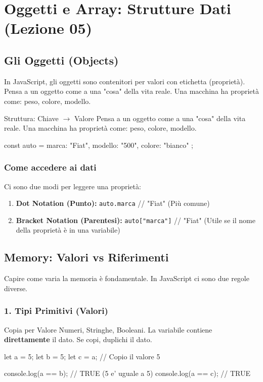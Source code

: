 \section{Oggetti e Array: Strutture Dati (Lezione 05)}

\subsection{Gli Oggetti (Objects)}
In JavaScript, gli oggetti sono contenitori per valori con etichetta (proprietà).
Pensa a un oggetto come a una "cosa" della vita reale. Una macchina ha proprietà come: peso, colore, modello.

\begin{concept}{Struttura: Chiave $\to$ Valore}
Pensa a un oggetto come a una "cosa" della vita reale. Una macchina ha proprietà come: peso, colore, modello.
\end{concept}
\begin{jsbox}
const auto = {
    marca: "Fiat",
    modello: "500",
    colore: "bianco"
};
\end{jsbox}

\subsubsection{Come accedere ai dati}
Ci sono due modi per leggere una proprietà:
\begin{enumerate}
    \item \textbf{Dot Notation (Punto):} \texttt{auto.marca} // "Fiat" (Più comune)
    \item \textbf{Bracket Notation (Parentesi):} \texttt{auto["marca"]} // "Fiat" (Utile se il nome della proprietà è in una variabile)
\end{enumerate}

\subsection{Memory: Valori vs Riferimenti}
Capire come varia la memoria è fondamentale. In JavaScript ci sono due regole diverse.

\subsubsection{1. Tipi Primitivi (Valori)}
\begin{concept}{Copia per Valore}
Numeri, Stringhe, Booleani. La variabile contiene \textbf{direttamente} il dato. Se copi, duplichi il dato.
\end{concept}
\begin{jsbox}
let a = 5;
let b = 5;
let c = a; // Copio il valore 5

console.log(a == b); // TRUE (5 e' uguale a 5)
console.log(a == c); // TRUE
\end{jsbox}

